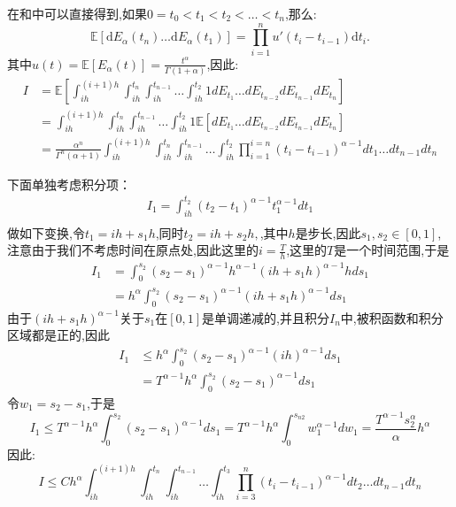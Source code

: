 \documentclass[12pt,final]{article}
\makeatletter
\numberwithin{equation}{section}
\numberwithin{figure}{section}
\numberwithin{table}{section}
\theoremstyle{plain}
\renewcommand{\proofname}{proof}
\theoremstyle{definition}
\theoremstyle{remark}
\renewenvironment{proof}[1][\proofname]{\par
	\pushQED{\qed}%
	\normalfont \topsep6\p@\@plus6\p@\relax
	\trivlist\item[\hskip\labelsep
	\bfseries #1\@addpunct{\,:\,}]\ignorespaces
}{%
	\popQED\endtrivlist\@endpefalse
}
\makeatother
\begin{document}
	
	\begin{proof}    
		在\cite{daley2003introduction}和\cite{magdziarz2009stochastic}中可以直接得到,如果$0 = t_0 < t_1 < t_2 < \ldots <t_n$,那么:
		\begin{equation*}
			\mathbb{E}[\mathrm dE_\alpha(t_n)\ldots\mathrm dE_\alpha(t_1)]=\prod_{i=1}^nu'(t_i-t_{i-1})\mathrm dt_i.
		\end{equation*}
		其中$u(t)=\mathbb{E}[E_\alpha(t)]=\frac{t^\alpha}{\Gamma(1+\alpha)}$,因此:
		\begin{align*}
			I &= \mathbb{E}\left[\int_{ih}^{(i+1)h}
			\int_{ih}^{t_n}\int_{ih}^{t_{n-1}} \ldots \int_{ih}^{t_{2}} 1 dE_{t_1} \ldots dE_{t_{n-2}}dE_{t_{n-1}}dE_{t_n}\right] \\
			& = \int_{ih}^{(i+1)h}\int_{ih}^{t_n}\int_{ih}^{t_{n-1}}
			\ldots \int_{ih}^{t_{2}} 1 \mathbb{E}\left[dE_{t_1} \ldots dE_{t_{n-2}}dE_{t_{n-1}}dE_{t_n}\right] \\
			& = \frac{\alpha^n}{\Gamma^n(\alpha+1)}
			\int_{ih}^{(i+1)h}\int_{ih}^{t_n}\int_{ih}^{t_{n-1}} \ldots \int_{ih}^{t_{2}} \prod_{i=1}^{i=n}(t_i-t_{i-1})^{\alpha -1} dt_1 \ldots dt_{n-1}dt_n
		\end{align*}
		
		下面单独考虑积分项：
		\begin{align*}
			I_{1}=\int_{ih}^{t_{2}} (t_{2}-t_1)^{\alpha -1} t_1^{\alpha - 1} dt_1 \\
		\end{align*}
		做如下变换,令$t_{1} = ih + s_{1}h$,同时$t_2 = ih + s_2h ,$,其中$h$是步长,因此$s_1,s_{2} \in [0,1]$,注意由于我们不考虑时间在原点处,因此这里的$i=\frac{T}{h}$,这里的$T$是一个时间范围,于是
		\begin{align*}
			I_1 &= \int_{0}^{s_{2}} (s_{2}-s_{1})^{\alpha -1}h^{\alpha -1} (ih + s_1h)^{\alpha - 1}h ds_1 \\
			&= h^{\alpha}\int_{0}^{s_{2}} (s_{2}-s_{1})^{\alpha -1} (ih + s_1h)^{\alpha - 1} ds_1
		\end{align*}
		由于$(ih + s_1h)^{\alpha - 1}$关于$s_1$在$[0,1]$是单调递减的,并且积分$I_n$中,被积函数和积分区域都是正的,因此
		\begin{align*}
			I_1 &\le h^{\alpha}\int_{0}^{s_{2}} (s_{2}-s_{1})^{\alpha -1} (ih)^{\alpha - 1} ds_1 \\
			&=  T^{\alpha - 1}h^{\alpha}\int_{0}^{s_{2}} (s_{2}-s_{1})^{\alpha -1} ds_1
		\end{align*}
		令$w_1=s_{2}-s_{1}$,于是
		\begin{equation*}
			I_1\le T^{\alpha - 1}h^{\alpha}\int_{0}^{s_{2}} (s_{2}-s_{1})^{\alpha -1} ds_1
			=  T^{\alpha - 1}h^{\alpha}\int_{0}^{s_{n2}} w_1^{\alpha -1} dw_1
			=  \frac{T^{\alpha - 1}s_{2}^\alpha}{\alpha}h^{\alpha}
		\end{equation*}
		因此:
		\begin{equation*}
			I \le Ch^\alpha
			\int_{ih}^{(i+1)h}\int_{ih}^{t_n}\int_{ih}^{t_{n-1}} \ldots \int_{ih}^{t_{3}} 
			\prod_{i=3}^{n}(t_i-t_{i-1})^{\alpha -1} dt_{2} \ldots dt_{n-1}dt_n
		\end{equation*}
		

\end{proof}
\end{document}

